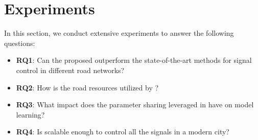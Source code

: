 
\section{Experiments}
In this section, we conduct extensive experiments to answer the following questions:
\begin{itemize}
	\item \textbf{RQ1}: Can the proposed \PressLight outperform the state-of-the-art methods for signal control in different road networks?
\	\item \textbf{RQ2}: How is the road resources utilized by \PressLight?
	\item \textbf{RQ3}: What impact does the parameter sharing leveraged in \PressLight have on model learning?
	\item \textbf{RQ4}: Is \PressLight scalable enough to control all the signals in a modern city?
\end{itemize}




